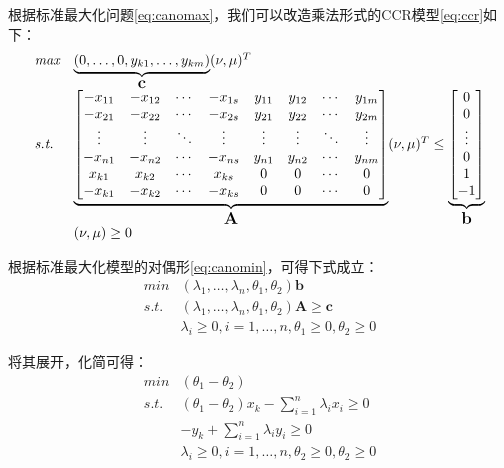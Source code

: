 \begin{shaded}
根据标准最大化问题\eqref{eq:canomax}，我们可以改造乘法形式的CCR模型\eqref{eq:ccr}如下：
\begin{equation}
\begin{array}{ll}
  \textit{max} & \underbrace{(0, \ldots, 0, y_{k1}, \ldots, y_{km})}_{\textbf{\large c}}(\nu,\mu)^T\\
  \textit{s.t.} &
  \underbrace{
\begin{bmatrix}
-x_{11} & -x_{12} & \cdots & -x_{1s} & y_{11} & y_{12} & \cdots & y_{1m}\\
-x_{21} & -x_{22} & \cdots & -x_{2s} & y_{21} & y_{22} & \cdots & y_{2m}\\
\vdots & \vdots & \ddots & \vdots & \vdots & \vdots & \ddots & \vdots\\
-x_{n1} & -x_{n2} & \cdots & -x_{ns} & y_{n1} & y_{n2} & \cdots & y_{nm}\\
x_{k1} & x_{k2} & \cdots & x_{ks} & 0 & 0 & \cdots & 0\\
-x_{k1} & -x_{k2} & \cdots & -x_{ks} & 0 & 0 & \cdots & 0\\
\end{bmatrix}
}_{\textbf{\large A}}
(\nu, \mu)^T \le
\underbrace{
\begin{bmatrix}
0\\
0\\
\vdots\\
0\\
1\\
-1\\
\end{bmatrix}
}_{\textbf{\large b}}\\
  & (\nu, \mu) \ge 0
\end{array}
\end{equation}

根据标准最大化模型的对偶形\eqref{eq:canomin}，可得下式成立：
\begin{equation}
\begin{array}{ll}
  \textit{min} & (\lambda_1, \ldots, \lambda_n, \theta_1, \theta_2) \textbf{b}\\
  \textit{s.t.} & (\lambda_1, \ldots, \lambda_n, \theta_1, \theta_2)\textbf{A} \ge \textbf{c}\\
  & \lambda_i \ge 0, i = 1,\ldots, n, \theta_1 \ge 0, \theta_2 \ge 0
\end{array}
\end{equation}

将其展开，化简可得：
\begin{equation}
\begin{array}{ll}
  \textit{min} & (\theta_1 - \theta_2)\\
  \textit{s.t.} & (\theta_1 - \theta_2) x_k - \sum\limits_{i = 1}^n \lambda_i x_i \ge 0 \\
   & -y_k + \sum\limits_{i = 1}^n \lambda_i y_i \ge 0\\
   & \lambda_i \ge 0, i = 1, \ldots, n, \theta_2 \ge 0, \theta_2 \ge 0
\end{array}
\end{equation}


\end{shaded}

